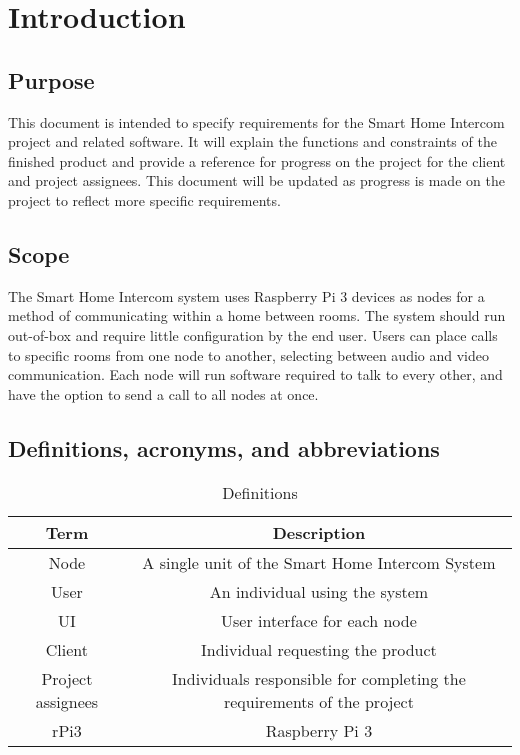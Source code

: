\documentclass[onecolumn, draftclsnofoot,10pt, compsoc]{IEEEtran}
\begin{document}
\section{Introduction}

\subsection{Purpose}
This document is intended to specify requirements for the Smart Home Intercom project and related software. It will explain the functions and constraints of the finished product and provide a reference for progress on the project for the client and project assignees. This document will be updated as progress is made on the project to reflect more specific requirements. 

\subsection{Scope}
The Smart Home Intercom system uses Raspberry Pi 3 devices as nodes for a method of communicating within a home between rooms. The system should run out-of-box and require little configuration by the end user. Users can place calls to specific rooms from one node to another, selecting between audio and video communication.  Each node will run software required to talk to every other, and have the option to send a call to all nodes at once. 

\subsection{Definitions, acronyms, and abbreviations}
\begin{table}[!htbp]
\centering
\begin{tabular}{|c|c|}
 \hline
 Term & Description \\ \hline
 Node & A single unit of the Smart Home Intercom System\\ \hline
 User & An individual using the system\\ \hline
 UI & User interface for each node\\ \hline
 Client & Individual requesting the product\\ \hline
 Project assignees & Individuals responsible for completing the requirements of the project\\ \hline
 rPi3 & Raspberry Pi 3\\ \hline
\end{tabular}
\caption{Definitions}
\end{table}
\end{document}
